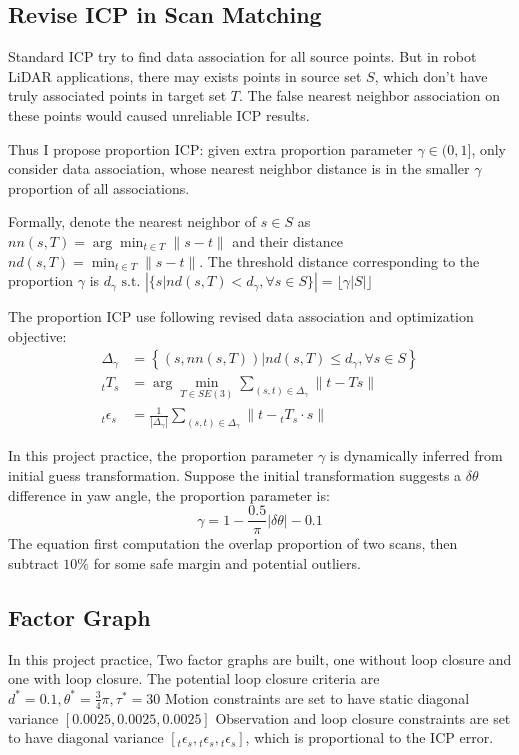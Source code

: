 \documentclass[conference]{IEEEtran}
\begin{document}
\subsection{Revise ICP in Scan Matching}
Standard ICP try to find data association for all source points.
But in robot LiDAR applications, there may exists points in source set $S$, 
which don't have truly associated points in target set $T$.
The false nearest neighbor association on these points would
caused unreliable ICP results.

Thus I propose proportion ICP: given extra proportion parameter $\gamma \in (0,1]$,
only consider data association, 
whose nearest neighbor distance is in the smaller $\gamma$ proportion of all associations.

Formally, denote the nearest neighbor of $s \in S$ as $nn(s, T) = \arg\min_{t \in T} \|s - t\|$ 
and their distance $nd(s, T) = \min_{t \in T} \|s - t\|$.
The threshold distance corresponding to the proportion $\gamma$ is 
$d_{\gamma} \text{ s.t. } \left|\{s | nd(s, T) < d_{\gamma}, \forall s \in S\}\right| = \lfloor\gamma |S| \rfloor$

The proportion ICP use following revised data association and optimization objective:
$$
\begin{aligned}
    \Delta_\gamma
    & = \left\{\left(s, nn(s,T) \right) | nd(s,T) \le d_{\gamma}, \forall s\in S\right\} \\
    {}_tT_s
    & = \arg\min_{T\in SE(3)} \sum\limits_{(s,t)\in\Delta_\gamma} \|t - Ts\| \\
    {}_t\epsilon_s
    & = \frac{1}{|\Delta_\gamma|} \sum\limits_{(s,t)\in\Delta_\gamma} \|t - {}_tT_s\cdot s\|
\end{aligned}
$$

In this project practice,
the proportion parameter $\gamma$ is dynamically inferred from initial guess transformation.
Suppose the initial transformation suggests a $\delta\theta$ difference in yaw angle,
the proportion parameter is:
$$\gamma = 1-\frac{0.5}{\pi}|\delta\theta| - 0.1$$
The equation first computation the overlap proportion of two scans, 
then subtract $10\%$ for some safe margin and potential outliers.

\subsection{Factor Graph}
In this project practice, 
Two factor graphs are built,
one without loop closure and one with loop closure.
The potential loop closure criteria are
$d^{*}=0.1, \theta^{*} =\frac{3}{4} \pi, \tau^{*} =30$
Motion constraints are set to have static 
diagonal variance $[0.0025, 0.0025, 0.0025]$
Observation and loop closure constraints are set to have 
diagonal variance $[{}_t\epsilon_{s}, {}_t\epsilon_{s}, {}_t\epsilon_{s}]$,
which is proportional to the ICP error.
\end{document}
